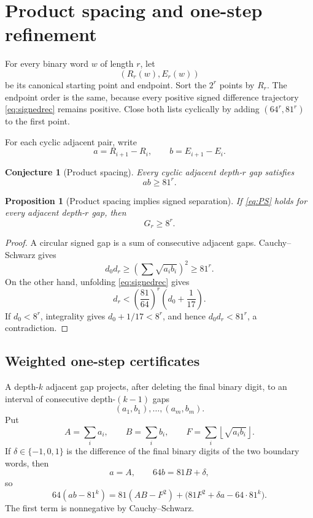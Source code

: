 \documentclass[11pt,reqno]{amsart}
\numberwithin{equation}{section}
\newtheorem{proposition}[theorem]{Proposition}
\newtheorem{conjecture}[theorem]{Conjecture}
\theoremstyle{definition}
\theoremstyle{remark}
\begin{document}
\section{Product spacing and one-step refinement}\label{sec:spacing}

For every binary word $w$ of length $r$, let
\[
 (R_r(w),E_r(w))
\]
be its canonical starting point and endpoint.  Sort the $2^r$ points by $R_r$.  The endpoint order is the same, because every positive signed difference trajectory \eqref{eq:signedrec} remains positive.  Close both lists cyclically by adding $(64^r,81^r)$ to the first point.

For each cyclic adjacent pair, write
\[
 a=R_{i+1}-R_i,
 \qquad
 b=E_{i+1}-E_i.
\]

\begin{conjecture}[Product spacing]\label{conj:PS}
Every cyclic adjacent depth-$r$ gap satisfies
\begin{equation}\label{eq:PS}
 ab\ge81^r.
\end{equation}
\end{conjecture}

\begin{proposition}[Product spacing implies signed separation]\label{prop:PSG}
If \eqref{eq:PS} holds for every adjacent depth-$r$ gap, then
\[
 G_r\ge8^r.
\]
\end{proposition}

\begin{proof}
A circular signed gap is a sum of consecutive adjacent gaps.  Cauchy--Schwarz gives
\[
 d_0d_r
 \ge
 \left(\sum\sqrt{a_ib_i}\right)^2
 \ge81^r.
\]
On the other hand, unfolding \eqref{eq:signedrec} gives
\[
 d_r<\left(\frac{81}{64}\right)^r
 \left(d_0+\frac1{17}\right).
\]
If $d_0<8^r$, integrality gives $d_0+1/17<8^r$, and hence $d_0d_r<81^r$, a contradiction.
\end{proof}

\subsection{Weighted one-step certificates}

A depth-$k$ adjacent gap projects, after deleting the final binary digit, to an interval of consecutive depth-$(k-1)$ gaps
\[
 (a_1,b_1),\ldots,(a_m,b_m).
\]
Put
\[
 A=\sum_i a_i,
 \qquad
 B=\sum_i b_i,
 \qquad
 F=\sum_i\left\lfloor\sqrt{a_ib_i}\right\rfloor.
\]
If $\delta\in\{-1,0,1\}$ is the difference of the final binary digits of the two boundary words, then
\begin{equation}\label{eq:conservation}
 a=A,
 \qquad
 64b=81B+\delta,
\end{equation}
so
\begin{equation}\label{eq:decomposition}
 64(ab-81^k)
 =81(AB-F^2)
 +\bigl(81F^2+\delta a-64\cdot81^k\bigr).
\end{equation}
The first term is nonnegative by Cauchy--Schwarz.
\end{document}
